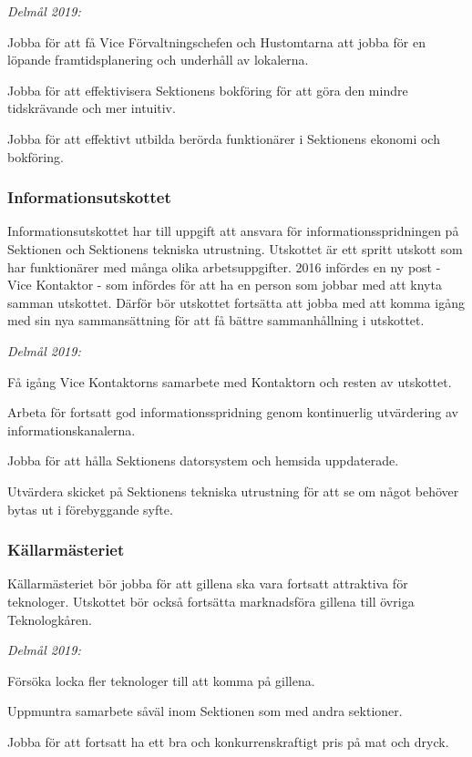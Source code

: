 \documentclass[../_main/handlingar.tex]{subfiles}
\begin{document}
\emph{Delmål 2019:}
\begin{dashlist}
    \item Jobba för att få Vice Förvaltningschefen och Hustomtarna att jobba för en löpande framtidsplanering och underhåll av lokalerna. 
    \item Jobba för att effektivisera Sektionens bokföring för att göra den mindre tidskrävande och mer intuitiv. 
    \item Jobba för att effektivt utbilda berörda funktionärer i Sektionens ekonomi och bokföring.
\end{dashlist}

\newpage

\subsubsection*{Informationsutskottet}
Informationsutskottet har till uppgift att ansvara för informationsspridningen på Sektionen och Sektionens tekniska utrustning. Utskottet är ett spritt utskott som har funktionärer med många olika arbetsuppgifter. 2016 infördes en ny post - Vice Kontaktor - som infördes för att ha en person som jobbar med att knyta samman utskottet. Därför bör utskottet fortsätta att jobba med att komma igång med sin nya sammansättning för att få bättre sammanhållning i utskottet.

\emph{Delmål 2019:}
\begin{dashlist}
    \item Få igång Vice Kontaktorns samarbete med Kontaktorn och resten av utskottet.
    \item Arbeta för fortsatt god informationsspridning genom kontinuerlig utvärdering av informationskanalerna.
    \item Jobba för att hålla Sektionens datorsystem och hemsida uppdaterade.
    \item Utvärdera skicket på Sektionens tekniska utrustning för att se om något behöver bytas ut i förebyggande syfte.
\end{dashlist}

\subsubsection*{Källarmästeriet}
Källarmästeriet bör jobba för att gillena ska vara fortsatt attraktiva för teknologer. Utskottet bör också fortsätta marknadsföra gillena till övriga Teknologkåren. 

\emph{Delmål 2019:}
\begin{dashlist}
    \item Försöka locka fler teknologer till att komma på gillena. 
    \item Uppmuntra samarbete såväl inom Sektionen som med andra sektioner. 
    \item Jobba för att fortsatt ha ett bra och konkurrenskraftigt pris på mat och dryck.
\end{dashlist}
\end{document}
